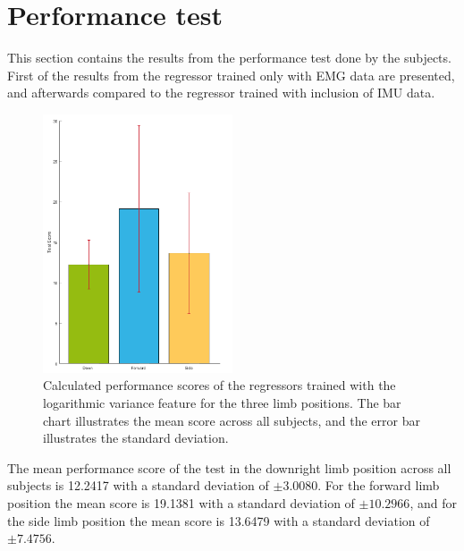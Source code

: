 \section{Performance test}
This section contains the results from the performance test done by the subjects. First of the results from the regressor trained only with EMG data are presented, and afterwards compared to the regressor trained with inclusion of IMU data. 

\begin{figure}[H]
	\includegraphics[width=0.5\textwidth]{figures/results/TestScore.png}  %
	\caption{Calculated performance scores of the regressors trained with the logarithmic variance feature for the three limb positions. The bar chart illustrates the mean score across all subjects, and the error bar illustrates the standard deviation.}
	\label{fig:TestScore}
\end{figure}

The mean performance score of the test in the downright limb position across all subjects is 12.2417 with a standard deviation of $\pm 3.0080$. For the forward limb position the mean score is 19.1381 with a standard deviation of $\pm 10.2966$, and for the side limb position the mean score is 13.6479 with a standard deviation of $\pm 7.4756$. 
